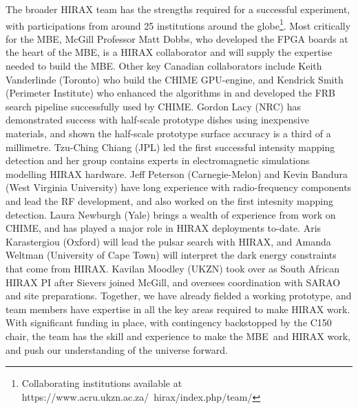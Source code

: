 \documentclass[letterpaper,11pt,preprint]{aastex}
\newcommand{\mbe}{{\rm MBE}}
\begin{document}
The broader HIRAX team has the strengths required for a successful
experiment, with participations from around 25 institutions around the
globe\footnote{Collaborating institutions available at
  https://www.acru.ukzn.ac.za/~hirax/index.php/team/}.  Most
critically for the \mbe, McGill Professor Matt Dobbs, who developed
the FPGA boards at the heart of the \mbe, is a HIRAX collaborator and
will supply the expertise needed to build the \mbe.  Other key
Canadian collaborators include Keith Vanderlinde (Toronto) who build
the CHIME GPU-engine, and Kendrick Smith (Perimeter Institute) who
enhanced the algorithms in \citet{Masui15} and developed the FRB
search pipeline successfully used by CHIME. Gordon Lacy (NRC) has
demonstrated success with half-scale prototype dishes using
inexpensive materials, and shown the half-scale prototype surface
accuracy is a third of a millimetre.  Tzu-Ching Chiang (JPL) led
the first successful intensity mapping detection \citep{Chang10} and
her group contains experts in electromagnetic simulations modelling
HIRAX hardware.  Jeff Peterson (Carnegie-Melon) and Kevin Bandura
(West Virginia University) have long experience with radio-frequency
components and lead the RF development, and also worked on the first
intesnity mapping detection.  Laura Newburgh (Yale) brings a wealth of
experience from work on CHIME, and has played a major role in HIRAX
deployments to-date.  Aris Karastergiou (Oxford) will lead the pulsar
search with HIRAX, and Amanda Weltman (University of Cape Town) will
interpret the dark energy constraints that come from HIRAX.  Kavilan
Moodley (UKZN) took over as South African HIRAX PI after Sievers
joined McGill, and oversees coordination with SARAO and site
preparations.  Together, we have already fielded a working prototype,
and team members have expertise in all the key areas required to make
HIRAX work.  With significant funding in place, with contingency
backstopped by the C150 chair, the team has the skill and experience
to make the \mbe\ and HIRAX work, and push our understanding of the
universe forward.
\end{document}
